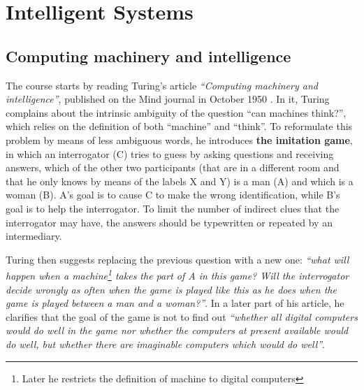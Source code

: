 \section{Intelligent Systems}
\subsection{Computing machinery and intelligence}

\par
The course starts by reading Turing's article \textit{``Computing machinery and intelligence''}, published on the Mind journal in October 1950 \cite{10.1093/mind/LIX.236.433}. In it, Turing complains about the intrinsic ambiguity of the question ``can machines think?'', which relies on the definition of both ``machine'' and ``think''. To reformulate this problem by means of less ambiguous words, he introduces \textbf{the imitation game}, in which an interrogator (C) tries to guess by asking questions and receiving answers, which of the other two participants (that are in a different room and that he only knows by means of the labels X and Y) is a man (A) and which is a woman (B). A's goal is to cause C to make the wrong identification, while B's goal is to help the interrogator. To limit the number of indirect clues that the interrogator may have, the answers should be typewritten or repeated by an intermediary.

\par
Turing then suggests replacing the previous question with a new one: \textit{``what will happen when a machine\footnote{Later he restricts the definition of machine to digital computers} takes the part of A in this game? Will the interrogator decide wrongly as often when the game is played like this as he does when the game is played between a man and a woman?''}. In a later part of his article, he clarifies that the goal of the game is not to find out \textit{``whether all digital computers would do well in the game nor whether the computers at present available would do well, but whether there are imaginable computers which would do well''}.

